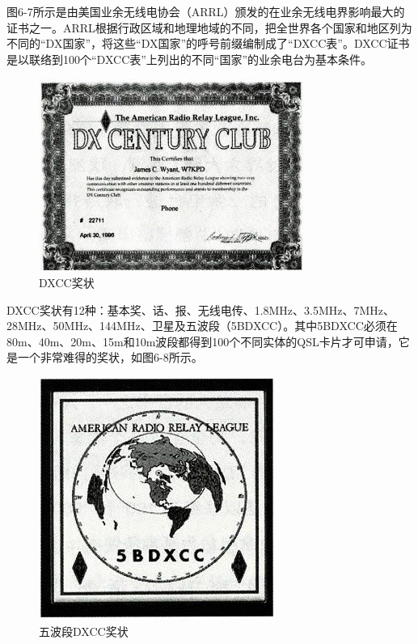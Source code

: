 \documentclass[12pt,UTF8]{ctexbook}
\begin{document}
图6-7所示是由美国业余无线电协会（ARRL）颁发的在业余无线电界影响最大的证书之一。ARRL根据行政区域和地理地域的不同，把全世界各个国家和地区列为不同的“DX国家”，将这些“DX国家”的呼号前缀编制成了“DXCC表”。DXCC证书是以联络到100个“DXCC表”上列出的不同“国家”的业余电台为基本条件。

\begin{figure}[htbp]
	\centering
	\includegraphics[width=0.7\linewidth]{77}
	\caption{DXCC奖状}
	\label{fig:1}
\end{figure}

DXCC奖状有12种：基本奖、话、报、无线电传、1.8MHz、3.5MHz、7MHz、28MHz、50MHz、144MHz、卫星及五波段（5BDXCC）。其中5BDXCC必须在80m、40m、20m、15m和10m波段都得到100个不同实体的QSL卡片才可申请，它是一个非常难得的奖状，如图6-8所示。

\begin{figure}[htbp]
	\centering
	\includegraphics[width=0.7\linewidth]{78}
	\caption{五波段DXCC奖状}
	\label{fig:1}
\end{figure}
\end{document}
